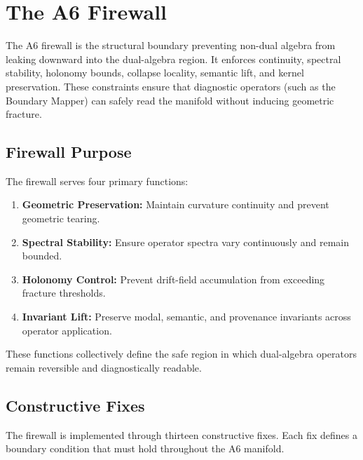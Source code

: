 
\section{The A6 Firewall}

The A6 firewall is the structural boundary preventing non-dual algebra from
leaking downward into the dual-algebra region. It enforces continuity,
spectral stability, holonomy bounds, collapse locality, semantic lift, and
kernel preservation. These constraints ensure that diagnostic operators
(such as the Boundary Mapper) can safely read the manifold without inducing
geometric fracture.

\subsection{Firewall Purpose}

The firewall serves four primary functions:

\begin{enumerate}
    \item \textbf{Geometric Preservation:} Maintain curvature continuity and
          prevent geometric tearing.
    \item \textbf{Spectral Stability:} Ensure operator spectra vary
          continuously and remain bounded.
    \item \textbf{Holonomy Control:} Prevent drift-field accumulation from
          exceeding fracture thresholds.
    \item \textbf{Invariant Lift:} Preserve modal, semantic, and provenance
          invariants across operator application.
\end{enumerate}

These functions collectively define the safe region in which dual-algebra
operators remain reversible and diagnostically readable.

\subsection{Constructive Fixes}

The firewall is implemented through thirteen constructive fixes. Each fix
defines a boundary condition that must hold throughout the A6 manifold.

